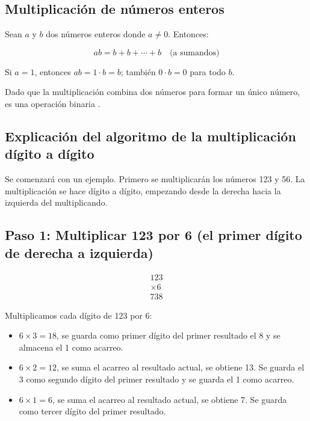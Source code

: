 \documentclass[10pt]{article}
\begin{document}
\subsection{Multiplicación de números enteros}

Sean $a$ y $b$ dos números enteros donde $a \neq 0$. Entonces:

\[
ab = b + b + \cdots + b \quad \text{(a sumandos)}
\]

Si $a = 1$, entonces $ab = 1 \cdot b = b$; también $0 \cdot b = 0$ para todo $b$.

\medskip

Dado que la multiplicación combina dos números para formar un único número, es una operación binaria \cite{X3}.

\subsection{Explicación del algoritmo de la multiplicación dígito a dígito}

Se comenzará con un ejemplo. Primero se multiplicarán los números 123 y 56. La multiplicación se hace dígito a dígito, empezando desde la derecha hacia la izquierda del multiplicando.

\subsection*{Paso 1: Multiplicar 123 por 6 (el primer dígito de derecha a izquierda)}

\[
\begin{array}{r}
     123 \\
  \times 6 \\
  \hline
     738
\end{array}
\]

Multiplicamos cada dígito de 123 por 6:

\begin{itemize}
    \item $6 \times 3 = 18$, se guarda como primer dígito del primer resultado el 8 y se almacena el 1 como acarreo.
    \item $6 \times 2 = 12$, se suma el acarreo al resultado actual, se obtiene 13. Se guarda el 3 como segundo dígito del primer resultado y se guarda el 1 como acarreo.
    \item $6 \times 1 = 6$, se suma el acarreo al resultado actual, se obtiene 7. Se guarda como tercer dígito del primer resultado.
\end{itemize}
\end{document}
